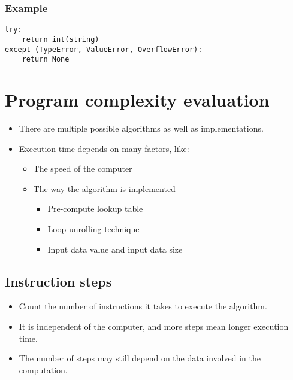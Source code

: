 \documentclass[11pt]{article}
\begin{document}
\subsubsection{Example}
\label{sec:org35d28e1}
\begin{verbatim}
try:
    return int(string)
except (TypeError, ValueError, OverflowError):
    return None
\end{verbatim}

 \newpage

\section{Program complexity evaluation}
\label{sec:org96c7002}
\begin{itemize}
\item There are multiple possible algorithms as well as implementations.
\item Execution time depends on many factors, like:
\begin{itemize}
\item The speed of the computer
\item The way the algorithm is implemented
\begin{itemize}
\item Pre-compute lookup table
\item Loop unrolling technique
\item Input data value and input data size
\end{itemize}
\end{itemize}
\end{itemize}

\subsection{Instruction steps}
\label{sec:orgfe0b0a7}
\begin{itemize}
\item Count the number of instructions it takes to execute the algorithm.
\item It is independent of the computer, and more steps mean longer execution time.
\item The number of steps may still depend on the data involved in the computation.
\end{itemize}
\end{document}
